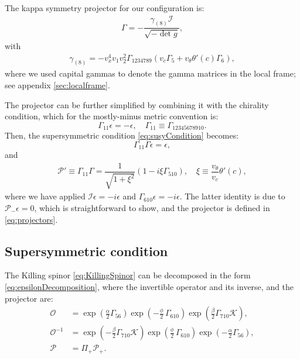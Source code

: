 The kappa symmetry projector for our configuration is:
\begin{align}
\Gamma = - \dfrac{ \gamma_{(8)} \mathcal{I} }{\sqrt{-\det g}},
\end{align}
with
\begin{align}
 \gamma_{(8)} = - v_x^4 v_1 v_2^2 \Gamma_{1 2 3 4 7 8 9}( v_c \Gamma_5 +  v_{\theta} \theta'(c) \Gamma_6), 
\end{align}
where we used capital gammas to denote the gamma matrices in the local frame; see appendix \ref{sec:localframe}.

The projector can be further simplified by combining it with the chirality condition, which for the mostly-minus metric convention is: 
\begin{equation}
 \Gamma_{11} \epsilon = -\epsilon, \quad 
 \Gamma_{11} \equiv \Gamma_{12345678910}.
\end{equation}
Then, the supersymmetric condition \eqref{eq:susyCondition} becomes:
\begin{equation}
 \Gamma_{11} \Gamma \epsilon = \epsilon,
\end{equation}
and 
\begin{align} \label{eq:newProjector}
  \mathcal{P}' \equiv \Gamma_{11} \Gamma  = \dfrac{1}{\sqrt{1+\xi^2}}(1- i \xi  \Gamma_{510}), \quad 
   \xi \equiv  \dfrac{v_\theta}{v_c} \theta'(c),
\end{align}
where we have applied $\mathcal{I} \epsilon = -i\epsilon$ and $\Gamma_{610} \epsilon = -i \epsilon$. The latter identity is due to $\mathcal{P}_- \epsilon = 0$, which is straightforward to show, and the projector is defined in \eqref{eq:projectors}.


\subsection{Supersymmetric condition}

The Killing spinor \eqref{eq:KillingSpinor} can be decomposed in the form \eqref{eq:epsilonDecomposition}, where the invertible operator and its inverse, and the projector are:
\begin{align}
 \mathcal{O} &= \exp{\left(\frac{\alpha}{2}\Gamma_{56} \right)} \exp{\left(-\frac{\phi}{2}\, \Gamma_{610} \right)} \exp{\left(\frac{\beta}{2}\Gamma_{710} \mathcal{K} \right)}, \\
 \mathcal{O}^{-1} &=  \exp{\left(-\frac{\beta}{2}\Gamma_{710} \mathcal{K} \right)} 
 \exp{\left(\frac{\phi}{2}\, \Gamma_{610} \right)} 
 \exp{\left(-\frac{\alpha}{2}\Gamma_{56} \right)},\\
 \mathcal{P} &= \Pi_+ \mathcal{P}_+.
\end{align}


